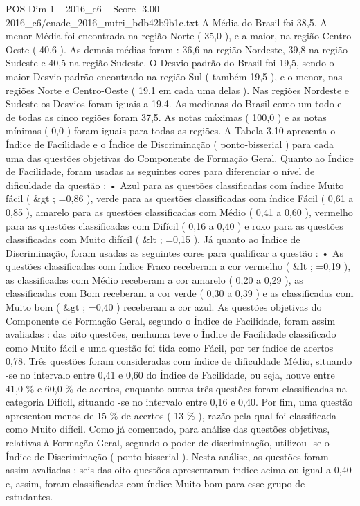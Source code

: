 \begin{textsample}{POS Dim 1 – 2016\_c6 – Score -3.00 – 2016\_c6/enade\_2016\_nutri\_bdb42b9b1c.txt}
A Média do Brasil foi 38,5.
A menor Média foi encontrada na região Norte ( 35,0 ), e a maior, na região Centro-Oeste ( 40,6 ).
As demais médias foram : 36,6 na região Nordeste, 39,8 na região Sudeste e 40,5 na região Sudeste.
O Desvio padrão do Brasil foi 19,5, sendo o maior Desvio padrão encontrado na região Sul ( também 19,5 ), e o menor, nas regiões Norte e Centro-Oeste ( 19,1 em cada uma delas ).
Nas regiões Nordeste e Sudeste os Desvios foram iguais a 19,4.
As medianas do Brasil como um todo e de todas as cinco regiões foram 37,5.
As notas máximas ( 100,0 ) e as notas mínimas ( 0,0 ) foram iguais para todas as regiões.
A Tabela 3.10 apresenta o Índice de Facilidade e o Índice de Discriminação ( ponto-bisserial ) para cada uma das questões objetivas do Componente de Formação Geral.
Quanto ao Índice de Facilidade, foram usadas as seguintes cores para diferenciar o nível de dificuldade da questão : • Azul para as questões classificadas com índice Muito fácil ( \&gt ; =0,86 ), verde para as questões classificadas com índice Fácil ( 0,61 a 0,85 ), amarelo para as questões classificadas com Médio ( 0,41 a 0,60 ), vermelho para as questões classificadas com Difícil ( 0,16 a 0,40 ) e roxo para as questões classificadas com Muito difícil ( \&lt ; =0,15 ).
Já quanto ao Índice de Discriminação, foram usadas as seguintes cores para qualificar a questão : • As questões classificadas com índice Fraco receberam a cor vermelho ( \&lt ; =0,19 ), as classificadas com Médio receberam a cor amarelo ( 0,20 a 0,29 ), as classificadas com Bom receberam a cor verde ( 0,30 a 0,39 ) e as classificadas com Muito bom ( \&gt ; =0,40 ) receberam a cor azul.
As questões objetivas do Componente de Formação Geral, segundo o Índice de Facilidade, foram assim avaliadas : das oito questões, nenhuma teve o Índice de Facilidade classificado como Muito fácil e uma questão foi tida como Fácil, por ter índice de acertos 0,78.
Três questões foram consideradas com índice de dificuldade Médio, situando -se no intervalo entre 0,41 e 0,60 do Índice de Facilidade, ou seja, houve entre 41,0 \% e 60,0 \% de acertos, enquanto outras três questões foram classificadas na categoria Difícil, situando -se no intervalo entre 0,16 e 0,40.
Por fim, uma questão apresentou menos de 15 \% de acertos ( 13 \% ), razão pela qual foi classificada como Muito difícil.
Como já comentado, para análise das questões objetivas, relativas à Formação Geral, segundo o poder de discriminação, utilizou -se o Índice de Discriminação ( ponto-bisserial ).
Nesta análise, as questões foram assim avaliadas : seis das oito questões apresentaram índice acima ou igual a 0,40 e, assim, foram classificadas com índice Muito bom para esse grupo de estudantes.

\end{textsample}
